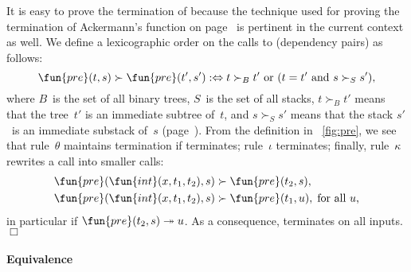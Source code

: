 It is easy to prove the termination of
 because the technique used for
proving the termination of Ackermann's function on
page~\pageref{par:ackermann} is pertinent in the current context as
well. We define a lexicographic order on the calls to 
(dependency pairs) as follows:
\begin{equation}
\fun{pre}(t,s) \succ \fun{pre}(t',s') :\Leftrightarrow \text{\(t
  \succ_{B} t'\) or (\(t = t'\) and \(s \succ_{S} s'\))},
\label{eq:BS_order}
\end{equation}
where \(B\)~is the set of all binary trees, \(S\)~is the set of all
stacks, \(t \succ_{B} t'\) means that the tree~\(t'\) is an immediate
subtree of~\(t\), and \(s
\succ_{S} s'\) means that the stack \(s'\)~is an immediate
substack of~\(s\)
(page~\pageref{par:well-founded}).  From the definition in
\fig~\vref{fig:pre}, we see that rule~\(\theta\) maintains termination
if  terminates; rule~\(\iota\)
terminates; finally, rule~\(\kappa\) rewrites a call into smaller
calls:
\begin{align*}
  \fun{pre}(\fun{int}(x,t_1,t_2),s) &\succ \fun{pre}(t_2,s),\\
  \fun{pre}(\fun{int}(x,t_1,t_2),s) &\succ \fun{pre}(t_1,u),\; \text{for
    all~\(u\),}
\end{align*}
in particular if \(\fun{pre}(t_2,s) \twoheadrightarrow u\). As a
consequence,  terminates on all
inputs.\hfill\(\Box\)

\paragraph{Equivalence}

